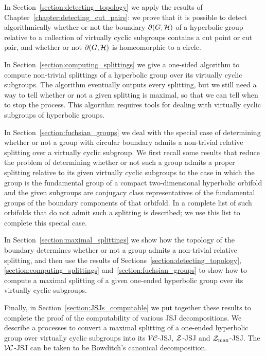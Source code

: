 In Section~\ref{section:detecting_topology} we apply the results of Chapter~\ref{chapter:detecting_cut_pairs}: we prove that it is possible to detect algorithmically whether or not the boundary $\partial(G, \mathcal{H})$ of a hyperbolic group relative to a collection of virtually cyclic subgroups contains a cut point or cut pair, and whether or not $\partial(G, \mathcal{H})$ is homeomorphic to a circle.

In Section~\ref{section:computing_splittings} we give a one-sided algorithm to compute non-trivial splittings of a hyperbolic group over its virtually cyclic subgroups.
The algorithm eventually outputs every splitting, but we still need a way to tell whether or not a given splitting is maximal, so that we can tell when to stop the process.
This algorithm requires tools for dealing with virtually cyclic subgroups of hyperbolic groups.

In Section~\ref{section:fuchsian_groups} we deal with the special case of determining whether or not a group with circular boundary admits a non-trivial relative splitting over a virtually cyclic subgroup.
We first recall some results that reduce the problem of determining whether or not such a group admits a proper splitting relative to its given virtually cyclic subgroups to the case in which the group is the fundamental group of a compact two-dimensional hyperbolic orbifold and the given subgroups are conjugacy class representatives of the fundamental groups of the boundary components of that orbifold. 
In \cite{guirardellevitt17} a complete list of such orbifolds that do not admit such a splitting is described; we use this list to complete this special case.

In Section~\ref{section:maximal_splittings} we show how the topology of the boundary determines whether or not a group admits a non-trivial relative splitting, and then use the results of Sections~\ref{section:detecting_topology}, \ref{section:computing_splittings} and~\ref{section:fuchsian_groups} to show how to compute a maximal splitting of a given one-ended hyperbolic group over its virtually cyclic subgroups.

Finally, in Section~\ref{section:JSJs_computable} we put together these results to complete the proof of the computability of various JSJ decompositions. 
We describe a processes to convert a maximal splitting of a one-ended hyperbolic group over virtually cyclic subgroups into its $\mathcal{VC}$-JSJ, $\mathcal{Z}$-JSJ and $\mathcal{Z}_\text{max}$-JSJ.
The $\mathcal{VC}$-JSJ can be taken to be Bowditch's canonical decomposition.

